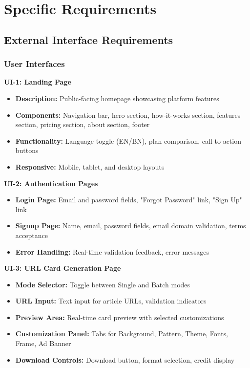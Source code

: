 \documentclass[12pt,a4paper]{article}
\begin{document}
\newpage

\section{Specific Requirements}

\subsection{External Interface Requirements}

\subsubsection{User Interfaces}

\textbf{UI-1: Landing Page}
\begin{itemize}
    \item \textbf{Description:} Public-facing homepage showcasing platform features
    \item \textbf{Components:} Navigation bar, hero section, how-it-works section, features section, pricing section, about section, footer
    \item \textbf{Functionality:} Language toggle (EN/BN), plan comparison, call-to-action buttons
    \item \textbf{Responsive:} Mobile, tablet, and desktop layouts
\end{itemize}

\textbf{UI-2: Authentication Pages}
\begin{itemize}
    \item \textbf{Login Page:} Email and password fields, "Forgot Password" link, "Sign Up" link
    \item \textbf{Signup Page:} Name, email, password fields, email domain validation, terms acceptance
    \item \textbf{Error Handling:} Real-time validation feedback, error messages
\end{itemize}

\textbf{UI-3: URL Card Generation Page}
\begin{itemize}
    \item \textbf{Mode Selector:} Toggle between Single and Batch modes
    \item \textbf{URL Input:} Text input for article URLs, validation indicators
    \item \textbf{Preview Area:} Real-time card preview with selected customizations
    \item \textbf{Customization Panel:} Tabs for Background, Pattern, Theme, Fonts, Frame, Ad Banner
    \item \textbf{Download Controls:} Download button, format selection, credit display
\end{itemize}
\end{document}
